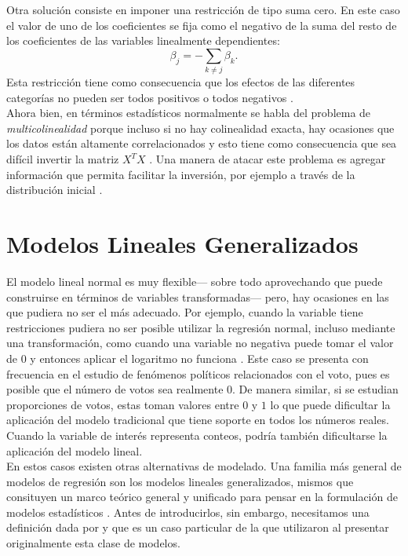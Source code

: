 Otra solución consiste en imponer una restricción de tipo suma cero. En este caso el valor de uno de los coeficientes se fija como el negativo de la suma del resto de los coeficientes de las variables linealmente dependientes:
\begin{equation*}
\beta_j=-\sum\limits_{k\neq j}\beta_k.
\end{equation*}
Esta restricción tiene como consecuencia que los efectos de las diferentes categorías no pueden ser todos positivos o todos negativos \parencite{Usi14}.\\

Ahora bien, en términos estadísticos normalmente se habla del problema de \textit{multicolinealidad} porque incluso si no hay colinealidad exacta, hay ocasiones que los datos están altamente correlacionados y esto tiene como consecuencia que sea difícil invertir la matriz $X^TX$ \parencite{Usi14}. Una manera de atacar este problema es agregar información que permita facilitar la inversión, por ejemplo a través de la distribución inicial \parencite{Congdon06}. 

\section{Modelos Lineales Generalizados}

El modelo lineal normal es muy flexible--- sobre todo aprovechando que puede construirse en términos de variables transformadas--- pero, hay ocasiones en las que pudiera no ser el más adecuado. Por ejemplo, cuando la variable tiene restricciones pudiera no ser posible utilizar la regresión normal, incluso mediante una transformación, como cuando una variable no negativa puede tomar el valor de $0$ y entonces aplicar el logaritmo no funciona \parencite{Gelman13}. Este caso se presenta con frecuencia en el estudio de fenómenos políticos relacionados con el voto, pues es posible que el número de votos sea realmente $0$. De manera similar, si se estudian proporciones de votos, estas toman valores entre $0$ y $1$ lo que puede dificultar la aplicación del modelo tradicional que tiene soporte en todos los números reales. Cuando la variable de interés representa conteos, podría también dificultarse la aplicación del modelo lineal.\\ 

En estos casos existen otras alternativas de modelado. Una familia más general de modelos de regresión son los modelos lineales generalizados, mismos que consituyen un marco teórico general y unificado para pensar en la formulación de modelos estadísticos \parencites{Dobson01}. Antes de introducirlos, sin embargo, necesitamos una definición dada por \textcite{Nieto16} y que es un caso particular de la que utilizaron \textcite{NelderWedderburn72} al presentar originalmente esta clase de modelos. 

